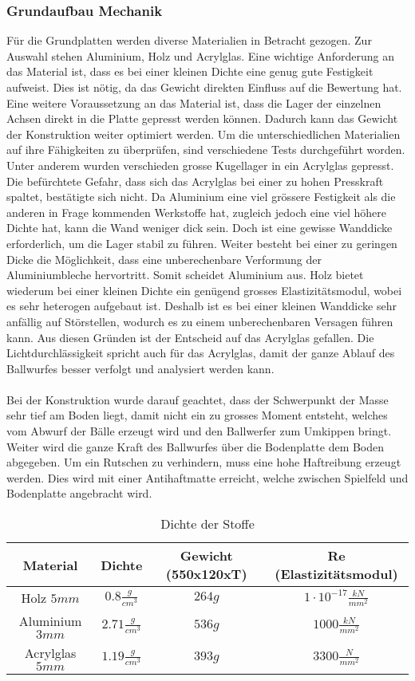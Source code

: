 \subsubsection{Grundaufbau Mechanik}
Für die Grundplatten werden diverse Materialien in Betracht gezogen. Zur Auswahl stehen Aluminium,
Holz und Acrylglas. Eine wichtige Anforderung an das Material ist, dass es bei einer kleinen Dichte
eine genug gute Festigkeit aufweist. Dies ist nötig, da das Gewicht direkten Einfluss auf die
Bewertung hat. Eine weitere Voraussetzung an das Material ist, dass die Lager der einzelnen Achsen
direkt in die Platte gepresst werden können. Dadurch kann das Gewicht der Konstruktion weiter
optimiert werden. Um die unterschiedlichen Materialien auf ihre Fähigkeiten zu überprüfen, sind
verschiedene Tests durchgeführt worden. Unter anderem wurden verschieden grosse Kugellager
in ein Acrylglas gepresst. Die befürchtete Gefahr, dass sich das Acrylglas bei einer zu hohen
Presskraft spaltet, bestätigte sich nicht. Da Aluminium eine viel grössere Festigkeit als die
anderen in Frage kommenden Werkstoffe hat, zugleich jedoch eine viel höhere Dichte hat, kann die
Wand weniger dick sein. Doch ist eine gewisse Wanddicke erforderlich, um die Lager stabil zu führen.
Weiter besteht bei einer zu geringen Dicke die Möglichkeit, dass eine unberechenbare Verformung der
Aluminiumbleche hervortritt. Somit scheidet Aluminium aus. Holz bietet wiederum bei einer kleinen
Dichte ein genügend grosses Elastizitätsmodul, wobei es sehr heterogen aufgebaut ist. Deshalb ist es
bei einer kleinen Wanddicke sehr anfällig auf Störstellen, wodurch es zu einem unberechenbaren
Versagen führen kann. Aus diesen Gründen ist der Entscheid auf das Acrylglas gefallen. Die
Lichtdurchlässigkeit spricht auch für das Acrylglas, damit der ganze Ablauf des Ballwurfes besser
verfolgt und analysiert werden kann.\\
\\
Bei der Konstruktion wurde darauf geachtet, dass der Schwerpunkt der Masse sehr tief am Boden liegt,
damit nicht ein zu grosses Moment entsteht, welches vom Abwurf der Bälle erzeugt wird und den
Ballwerfer zum Umkippen bringt. Weiter wird die ganze Kraft des Ballwurfes über die Bodenplatte dem
Boden abgegeben. Um ein Rutschen zu verhindern, muss eine hohe Haftreibung erzeugt werden. Dies wird
mit einer Antihaftmatte erreicht, welche zwischen Spielfeld und Bodenplatte angebracht wird.
\begin{table}[h!]
	\centering
	\begin{tabular}{cccc}
		Material & Dichte & Gewicht (550x120xT) & Re (Elastizitätsmodul) \\ 
		\hline \rule{0pt}{11pt}Holz $5 mm$ & $0.8 \frac{g}{cm^3}$ & $264 g$ & $1 \cdot 10^{-17} \frac{kN}{mm^2}$ \\ 
		\rule{0pt}{11pt}Aluminium $3 mm$ & $2.71 \frac{g}{cm^3}$ & $536 g$ & $1000 \frac{kN}{mm^2}$ \\ 
		\rule{0pt}{11pt}Acrylglas $5 mm$ & $1.19 \frac{g}{cm^3}$ & $393 g$ & $3300 \frac{N}{mm^2}$  \\ 
	\end{tabular} 
	\caption[Dichte der Stoffe]{Dichte der Stoffe \cite{M:Chemie}}
\end{table}